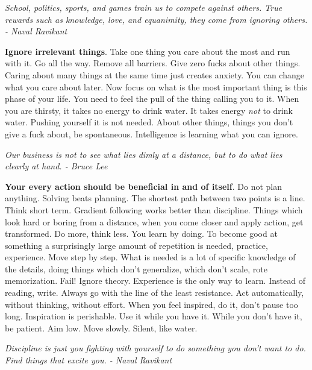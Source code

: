 \documentclass[a4paper,hidelinks]{article}
\begin{document}
\newpage

\begin{center}
\textit{School, politics, sports, and games train us to compete against others. True rewards such as knowledge, love, and equanimity, they come from ignoring others. - Naval Ravikant}
\end{center}

\textbf{Ignore irrelevant things}.
Take one thing you care about the most and run with it.
Go all the way.
Remove all barriers.
Give zero fucks about other things.
Caring about many things at the same time just creates anxiety.
You can change what you care about later.
Now focus on what is the most important thing is this phase of your life.
You need to feel the pull of the thing calling you to it.
When you are thirsty, it takes no energy to drink water.
It takes energy \textit{not} to drink water.
Pushing yourself it is not needed.
About other things, things you don't give a fuck about, be spontaneous.
Intelligence is learning what you can ignore.

\newpage

\begin{center}
\textit{Our business is not to see what lies dimly at a distance, but to do what lies clearly at hand. - Bruce Lee}
\end{center}

\textbf{Your every action should be beneficial in and of itself}.
Do not plan anything.
Solving beats planning.
The shortest path between two points is a line.
Think short term.
Gradient following works better than discipline.
Things which look hard or boring from a distance, when you come closer and apply action, get transformed.
Do more, think less.
You learn by doing.
To become good at something a surprisingly large amount of repetition is needed, practice, experience.
Move step by step.
What is needed is a lot of specific knowledge of the details, doing things which don't generalize, which don't scale, rote memorization.
Fail!
Ignore theory.
Experience is the only way to learn.
Instead of reading, write.
Always go with the line of the least resistance.
Act automatically, without thinking, without effort.
When you feel inspired, do it, don't pause too long.
Inspiration is perishable.
Use it while you have it.
While you don't have it, be patient.
Aim low.
Move slowly.
Silent, like water.

\newpage

\begin{center}
\textit{Discipline is just you fighting with yourself to do something you don't want to do. Find things that excite you. - Naval Ravikant}
\end{center}
\end{document}
